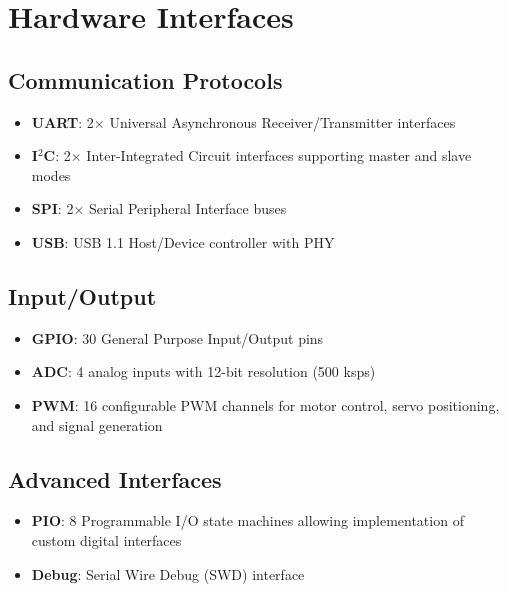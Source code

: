 \section{Hardware Interfaces}

\subsection{Communication Protocols}
\begin{itemize}
    \item \textbf{UART}: 2$\times$ Universal Asynchronous Receiver/Transmitter interfaces \cite{RaspberryPiRP2040:2024}
    \item \textbf{I$^2$C}: 2$\times$ Inter-Integrated Circuit interfaces supporting master and slave modes \cite{RaspberryPiRP2040:2024}
    \item \textbf{SPI}: 2$\times$ Serial Peripheral Interface buses \cite{RaspberryPiRP2040:2024}
    \item \textbf{USB}: USB 1.1 Host/Device controller with PHY \cite{RaspberryPiRP2040:2024}
\end{itemize}

\subsection{Input/Output}
\begin{itemize}
    \item \textbf{GPIO}: 30 General Purpose Input/Output pins \cite{RaspberryPiRP2040:2024}
    \item \textbf{ADC}: 4 analog inputs with 12-bit resolution (500 ksps) \cite{RaspberryPiRP2040:2024}
    \item \textbf{PWM}: 16 configurable PWM channels for motor control, servo positioning, and signal generation \cite{Schneider:2023}
\end{itemize}

\subsection{Advanced Interfaces}
\begin{itemize}
    \item \textbf{PIO}: 8 Programmable I/O state machines allowing implementation of custom digital interfaces \cite{RaspberryPiRP2040:2024}
    \item \textbf{Debug}: Serial Wire Debug (SWD) interface \cite{RaspberryPiRP2040:2024}
\end{itemize}

